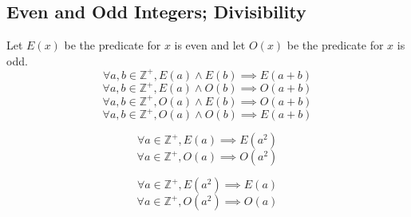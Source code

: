 \subsection{Even and Odd Integers; Divisibility}
\begin{theorem}
Let $E(x)$ be the predicate for $x$ is even and let $O(x)$ be the predicate for $x$ is odd.
\[
\forall a, b \in \mathbb{Z}^+, E(a) \land E(b) \implies E(a + b)
\]
\[
\forall a, b \in \mathbb{Z}^+, E(a) \land O(b) \implies O(a + b)
\]
\[
\forall a, b \in \mathbb{Z}^+, O(a) \land E(b) \implies O(a + b)
\]
\[
\forall a, b \in \mathbb{Z}^+, O(a) \land O(b) \implies E(a + b)
\]
\end{theorem}
\begin{theorem}
\[
\forall a \in \mathbb{Z}^+, E(a) \implies E(a^2)
\]
\[
\forall a \in \mathbb{Z}^+, O(a) \implies O(a^2)
\]
\end{theorem}
\begin{corollary}
\[
\forall a \in \mathbb{Z}^+, E(a^2) \implies E(a)
\]
\[
\forall a \in \mathbb{Z}^+, O(a^2) \implies O(a)
\]
\end{corollary}
